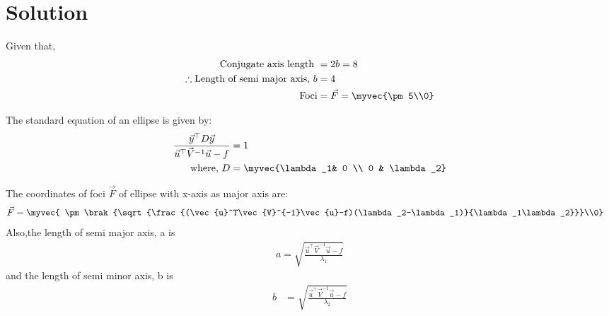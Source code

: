 \documentclass[journal,12pt,twocolumn]{IEEEtran}
\begin{document}
\section{Solution}
Given that,
\begin{align}
\text{Conjugate axis length }&= 2b = 8 
\\
\therefore \text{Length of semi major axis, } b&=4\label{eqA}
  \\
\text{Foci}&=\vec{F} = \myvec{\pm5\\0} \label{eqB}
\end{align}
\begin{lemma}
\label{lemma}
The standard equation of an ellipse is given by:
\begin{align}
\frac{\vec{y}^{\top}D\vec{y}}{\vec{u}^{\top}\vec{V}^{-1}\vec{u}-f}&=1
\\
\text{where, } D &=\myvec{\lambda_1& 0 \\ 0 & \lambda_2}
\end{align}
\end{lemma}
\begin{lemma}
The coordinates of foci $\vec{F}$ of ellipse  with x-axis as major axis are:
 \begin{align}
  \vec{F} &= \myvec{ \pm \brak{\sqrt{\frac{(\vec{u}^T\vec{V}^{-1}\vec{u}-f)(\lambda_2-\lambda_1)}{\lambda_1\lambda_2}}}\\0} \label{eqC}
\end{align}
Also,the length of semi major axis, a is
\begin{align}
  a = \sqrt{\frac{\vec{u}^{\top}\vec{V}^{-1}\vec{u}-f}{\lambda_1}} 
  \end{align}
and the length of semi minor axis, b is
  \begin{align}
  b &= \sqrt{\frac{\vec{u}^{\top}\vec{V}^{-1}\vec{u}-f}{\lambda_2}} \label{eqD}
 \end{align}
\end{lemma}
\end{document}
